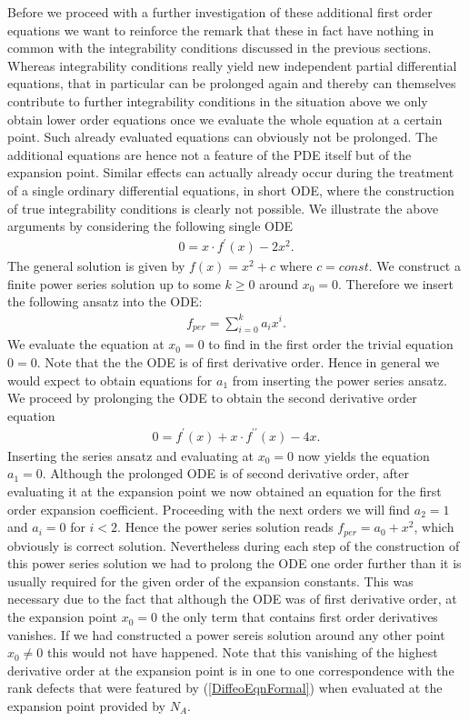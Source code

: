 \documentclass[a4paper,12pt, DIV=14, BCOR=5mm, twoside, headsepline, numbers=noenddot]{scrbook}
\begin{document}
Before we proceed with a further investigation of these additional first order equations we want to reinforce the remark that these in fact have nothing in common with the integrability conditions discussed in the previous sections. Whereas integrability conditions really yield new independent partial differential equations, that in particular can be prolonged again and thereby can themselves contribute to further integrability conditions in the situation above we only obtain lower order equations once we evaluate the whole equation at a certain point. Such already evaluated equations can obviously not be prolonged. The additional equations are hence not a feature of the PDE itself but of the expansion point. Similar effects can actually already occur during the treatment of a single ordinary differential equations, in short ODE, where the construction of true integrability conditions is clearly not possible. We illustrate the above arguments by considering the following single ODE
\begin{align}
    0 = x \cdot f^{\prime}(x) - 2x^2.
\end{align}
The general solution is given by $f(x) = x^2 +c$ where $c=const$. We construct a finite power series solution up to some $k \geq 0$ around $x_0 = 0$. Therefore we insert the following ansatz into the ODE:
\begin{align}
    f_{per} = \sum_{i=0}^k a_i x^i.
\end{align}
We evaluate the equation at $x_0=0$ to find in the first order the trivial equation $0=0$. Note that the the ODE is of first derivative order. Hence in general we would expect to obtain equations for $a_1$ from inserting the power series ansatz. We proceed by prolonging the ODE to obtain the second derivative order equation
\begin{align}
    0 = f^{\prime}(x) + x \cdot f^{\prime \prime}(x) - 4 x.
\end{align}
Inserting the series ansatz and evaluating at $x_0=0$ now yields the equation $a_1=0$. Although the prolonged ODE is of second derivative order, after evaluating it at the expansion point we now obtained an equation for the first order expansion coefficient. Proceeding with the next orders we will find $a_2 = 1$ and $a_i = 0$ for $i < 2$. Hence the power series solution reads $f_{per} = a_0 + x^2$, which obviously is correct solution. Nevertheless during each  step of the construction of this power series solution we had to prolong the ODE one order further than it is usually required for the given order of the expansion constants. This was necessary due to the fact that although the ODE was of first derivative order, at the expansion point $x_0=0$ the only term that contains first order derivatives vanishes. If we had constructed a power sereis solution around any other point $x_0 \neq 0$ this would not have happened. Note that this vanishing of the highest derivative order at the expansion point is in one to one correspondence with the rank defects that were featured by (\ref{DiffeoEqnFormal}) when evaluated at the expansion point provided by $N_A$. \\
\end{document}
